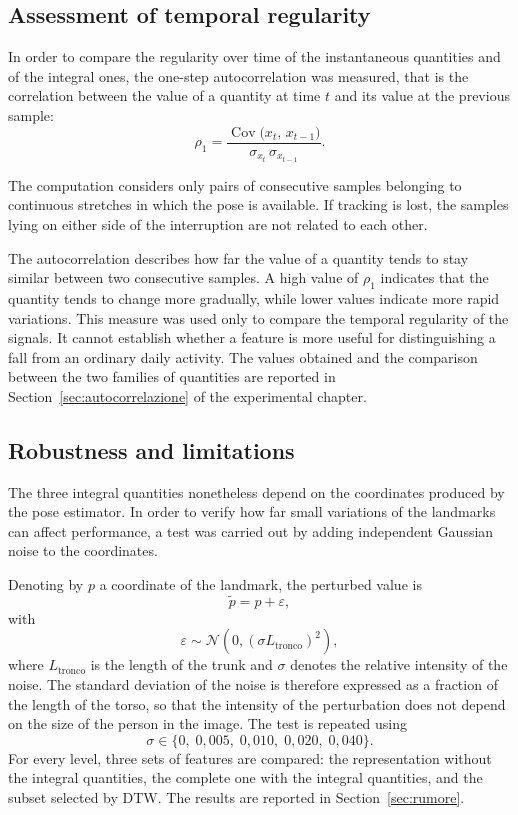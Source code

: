 \subsection{Assessment of temporal regularity}
\label{sec:regolarita}

In order to compare the regularity over time of the instantaneous quantities and of the integral ones, the one-step autocorrelation was measured, that is the correlation between the value of a quantity at time \(t\) and its value at the previous sample:
\[
\rho_1 = \frac{\operatorname{Cov}\big(x_t,\,x_{t-1}\big)}
              {\sigma_{x_t}\,\sigma_{x_{t-1}}}.
\]

The computation considers only pairs of consecutive samples belonging to continuous stretches in which the pose is available. If tracking is lost, the samples lying on either side of the interruption are not related to each other.

The autocorrelation describes how far the value of a quantity tends to stay similar between two consecutive samples. A high value of \(\rho_1\) indicates that the quantity tends to change more gradually, while lower values indicate more rapid variations.
This measure was used only to compare the temporal regularity of the signals. It cannot establish whether a feature is more useful for distinguishing a fall from an ordinary daily activity. The values obtained and the comparison between the two families of quantities are reported in Section~\ref{sec:autocorrelazione} of the experimental chapter.

\subsection{Robustness and limitations}
\label{sec:robustezza}

The three integral quantities nonetheless depend on the coordinates produced by the pose estimator. In order to verify how far small variations of the landmarks can affect performance, a test was carried out by adding independent Gaussian noise to the coordinates.

Denoting by \(p\) a coordinate of the landmark, the perturbed value is
\[ \tilde{p}=p+\varepsilon,
\]
with
\[ \varepsilon \sim \mathcal{N} \left(0,\left(\sigma L_{\text{tronco}}\right)^2\right),
\]
where \(L_{\text{tronco}}\) is the length of the trunk and \(\sigma\) denotes the relative intensity of the noise. The standard deviation of the noise is therefore expressed as a fraction of the length of the torso, so that the intensity of the perturbation does not depend on the size of the person in the image.
The test is repeated using
\[
\sigma \in \{0,\;0{,}005,\;0{,}010,\;0{,}020,\;0{,}040\}.
\]
For every level, three sets of features are compared: the representation without the integral quantities, the complete one with the integral quantities, and the subset selected by DTW. The results are reported in Section~\ref{sec:rumore}.

